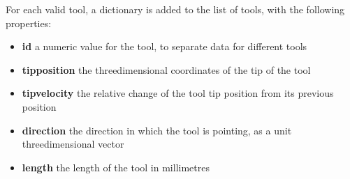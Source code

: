 For each valid tool, a dictionary is added to the list of tools, with the following
properties:
\begin{itemize}
\item\textbf{id} \longDash{} a numeric value for the tool, to separate data for different
tools
\item\exSp\textbf{tipposition} \longDash{} the three\longDash{}dimensional coordinates of
the tip of the tool
\item\exSp\textbf{tipvelocity} \longDash{} the relative change of the tool tip position
from its previous position
\item\exSp\textbf{direction} \longDash{} the direction in which the tool is pointing, as a
unit three\longDash{}dimensional vector
\item\exSp\textbf{length} \longDash{} the length of the tool in millimetres
\end{itemize}
\primaryEnd{}
